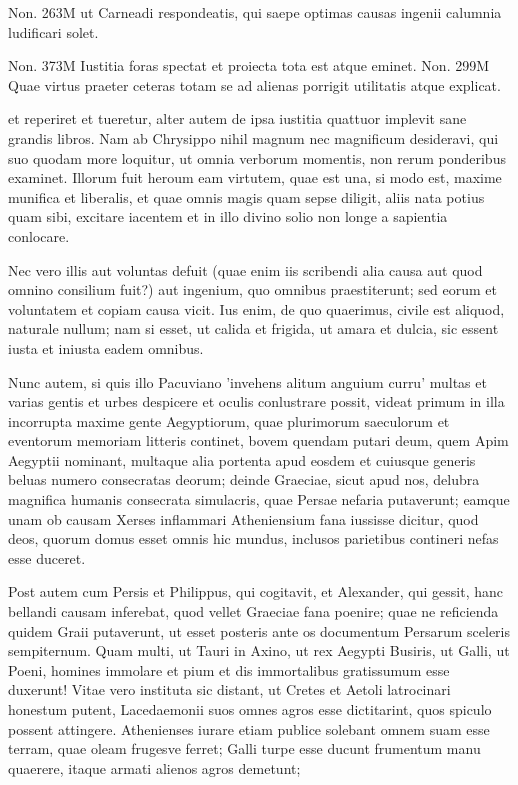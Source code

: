  Non. 263M ut Carneadi respondeatis, qui saepe optimas causas ingenii calumnia ludificari solet.

 Non. 373M Iustitia foras spectat et proiecta tota est atque eminet. Non. 299M Quae virtus praeter ceteras totam se ad alienas porrigit utilitatis atque explicat.

 et reperiret et tueretur, alter autem de ipsa iustitia quattuor implevit sane grandis libros. Nam ab Chrysippo nihil magnum nec magnificum desideravi, qui suo quodam more loquitur, ut omnia verborum momentis, non rerum ponderibus examinet. Illorum fuit heroum eam virtutem, quae est una, si modo est, maxime munifica et liberalis, et quae omnis magis quam sepse diligit, aliis nata potius quam sibi, excitare iacentem et in illo divino solio non longe a sapientia conlocare.

 Nec vero illis aut voluntas defuit (quae enim iis scribendi alia causa aut quod omnino consilium fuit?) aut ingenium, quo omnibus praestiterunt; sed eorum et voluntatem et copiam causa vicit. Ius enim, de quo quaerimus, civile est aliquod, naturale nullum; nam si esset, ut calida et frigida, ut amara et dulcia, sic essent iusta et iniusta eadem omnibus.

 Nunc autem, si quis illo Pacuviano 'invehens alitum anguium curru' multas et varias gentis et urbes despicere et oculis conlustrare possit, videat primum in illa incorrupta maxime gente Aegyptiorum, quae plurimorum saeculorum et eventorum memoriam litteris continet, bovem quendam putari deum, quem Apim Aegyptii nominant, multaque alia portenta apud eosdem et cuiusque generis beluas numero consecratas deorum; deinde Graeciae, sicut apud nos, delubra magnifica humanis consecrata simulacris, quae Persae nefaria putaverunt; eamque unam ob causam Xerses inflammari Atheniensium fana iussisse dicitur, quod deos, quorum domus esset omnis hic mundus, inclusos parietibus contineri nefas esse duceret.

 Post autem cum Persis et Philippus, qui cogitavit, et Alexander, qui gessit, hanc bellandi causam inferebat, quod vellet Graeciae fana poenire; quae ne reficienda quidem Graii putaverunt, ut esset posteris ante os documentum Persarum sceleris sempiternum. Quam multi, ut Tauri in Axino, ut rex Aegypti Busiris, ut Galli, ut Poeni, homines immolare et pium et dis immortalibus gratissumum esse duxerunt! Vitae vero instituta sic distant, ut Cretes et Aetoli latrocinari honestum putent, Lacedaemonii suos omnes agros esse dictitarint, quos spiculo possent attingere. Athenienses iurare etiam publice solebant omnem suam esse terram, quae oleam frugesve ferret; Galli turpe esse ducunt frumentum manu quaerere, itaque armati alienos agros demetunt;

